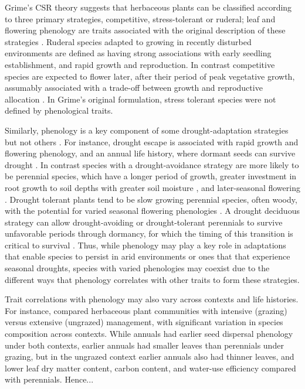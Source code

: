 \documentclass[11pt]{article}
\begin{document}
Grime's CSR theory \citep{grime1977evidence} suggests that herbaceous plants can be classified according to three primary strategies, competitive, stress-tolerant or ruderal; leaf and flowering phenology are traits associated with the original description of these strategies \citep[see Table 2 in][]{grime1977evidence}. Ruderal species adapted to growing in recently disturbed environments are defined as having strong associations with early seedling establishment, and rapid growth and reproduction. In contrast competitive species are expected to flower later, after their period of peak vegetative growth, assumably associated with a trade-off between growth and reproductive allocation \citep{law1979cost}. In Grime’s original formulation, stress tolerant species were not defined by phenological traits.

Similarly, phenology is a key component of some drought-adaptation strategies but not others \citep{kooyers2015evolution}. For instance, drought escape is associated with rapid growth and flowering phenology, and an annual life history, where dormant seeds can survive drought \citep{fox1992evolution}. In contrast species with a drought-avoidance strategy are more likely to be perennial species, which have a longer period of growth, greater investment in root growth to soil depths with greater soil moisture \citep{padilla2007rooting}, and later-seasonal flowering \citep{seabloom2003invasion}. Drought tolerant plants tend to be slow growing perennial species, often woody, with the potential for varied seasonal flowering phenologies \citep{williams1997leaf}.  A drought deciduous strategy can allow drought-avoiding or drought-tolerant perennials to survive unfavorable periods through dormancy, for which the timing of this transition is critical to survival \citep{gillespie2017winter}. Thus, while phenology may play a key role in adaptations that enable species to persist in arid environments or ones that that experience seasonal droughts, species with varied phenologies may coexist due to the different ways that phenology correlates with other traits to form these strategies.


Trait correlations with phenology may also vary across contexts and life histories. For instance, \citep{delalandre2023trait} compared herbaceous plant communities with intensive (grazing) versus extensive (ungrazed) management, with significant variation in species composition across contexts. While annuals had earlier seed dispersal phenology under both contexts, earlier annuals had smaller leaves than perennials under grazing, but in the ungrazed context earlier annuals also had thinner leaves, and lower leaf dry matter content, carbon content, and water-use efficiency compared with perennials. Hence...
\end{document}
